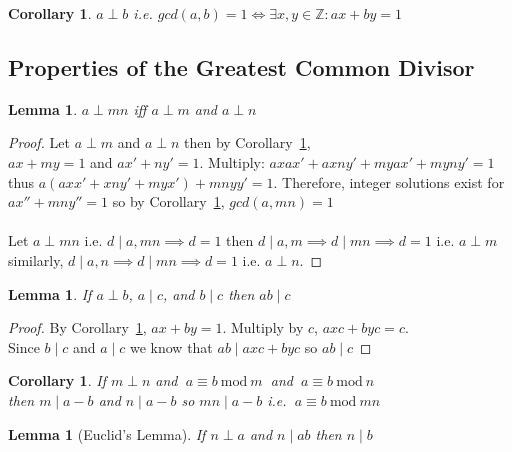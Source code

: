 \documentclass[12pt]{extarticle}
\renewcommand\qedsymbol{$\square$}
\newcommand{\divides}{\mid}
\newcommand{\Z}{\mathbb{Z}}
\newtheorem{lemma}[theorem]{Lemma}
\newtheorem{corollary}[theorem]{Corollary}
\newenvironment{lproof}{\begin{proof} \renewcommand{\qedsymbol}{}}{\end{proof}}
\renewcommand{\mod}[3]{\: #1 \equiv #2 \: \mathrm{mod} \: #3 \:}
\begin{document}
\begin{corollary}
\label{gcdcoprime}
$a \perp b$ i.e. $gcd(a,b) = 1 \iff \exists x,y \in \Z : ax+by = 1$
\end{corollary}

\subsection{Properties of the Greatest Common Divisor}

\begin{lemma}
\label{coprimeprodsarecoprime}
$a \perp mn$ iff $a \perp m$ and $a \perp n$
\end{lemma}

\begin{lproof}
Let $a \perp m$ and $a \perp n$ then by Corollary~\ref{gcdcoprime}, \\$ax+my = 1$ and $ax'+ny' = 1$. Multiply: $axax'+axny'+myax'+myny' = 1$ thus $a(axx' + xny'+myx') + mnyy' = 1$.
Therefore, integer solutions exist for $ax'' + mny'' = 1$ so by Corollary~\ref{gcdcoprime}, $gcd(a,mn) = 1$
 \\\\ Let $a \perp mn$ i.e. $d \divides a,mn \implies d=1$ then $d \divides a,m \implies d \divides mn \implies d = 1$ i.e. $a \perp m$ similarly, $d \divides a,n \implies d \divides mn \implies d = 1$ i.e. $a \perp n$.
\end{lproof}


\begin{lemma}
\label{coprimeprod}
If $a \perp b$, $a \divides c$, and $b \divides c$ then $ab \divides c$
\end{lemma}

\begin{lproof}
By Corollary~\ref{gcdcoprime}, $ax+by = 1$. Multiply by $c$, $axc + byc = c$. \\
Since $b \divides c$ and $a \divides c$ we know that $ab \divides axc + byc$ so $ab \divides c$
\end{lproof}

\begin{corollary}
\label{coprimeprodmods}
If $m \perp n$ and $\mod{a}{b}{m}$ and $\mod{a}{b}{n}$\\ then $m \divides a-b$ and $n \divides a-b$ so $mn \divides a-b$ i.e. $\mod{a}{b}{mn}$
\end{corollary}


\begin{lemma}[Euclid's Lemma]
\label{euclidlem}
If $n \perp a$ and $n \divides ab$ then $n \divides b$
\end{lemma}
\end{document}
